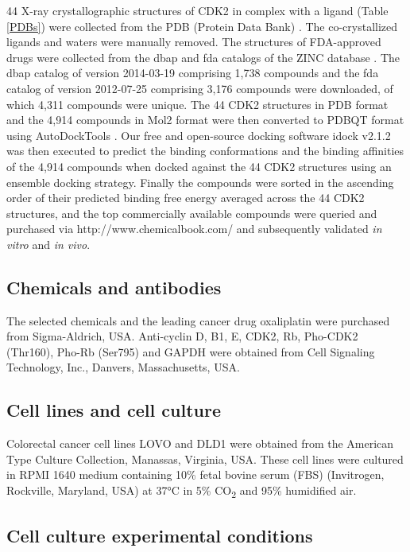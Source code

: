 \documentclass[10pt]{article}
\begin{document}
44 X-ray crystallographic structures of CDK2 in complex with a ligand (Table \ref{PDBs}) were collected from the PDB (Protein Data Bank) \citep{540,537}. The co-crystallized ligands and waters were manually removed. The structures of FDA-approved drugs were collected from the dbap and fda catalogs of the ZINC database \citep{532,1178}. The dbap catalog of version 2014-03-19 comprising 1,738 compounds and the fda catalog of version 2012-07-25 comprising 3,176 compounds were downloaded, of which 4,311 compounds were unique. The 44 CDK2 structures in PDB format and the 4,914 compounds in Mol2 format were then converted to PDBQT format using AutoDockTools \citep{596}. Our free and open-source docking software idock v2.1.2 \citep{1153,1362} was then executed to predict the binding conformations and the binding affinities of the 4,914 compounds when docked against the 44 CDK2 structures using an ensemble docking strategy. Finally the compounds were sorted in the ascending order of their predicted binding free energy averaged across the 44 CDK2 structures, and the top commercially available compounds were queried and purchased via http://www.chemicalbook.com/ and subsequently validated \textit{in vitro} and \textit{in vivo}.

\subsection*{Chemicals and antibodies}

The selected chemicals and the leading cancer drug oxaliplatin were purchased from Sigma-Aldrich, USA. Anti-cyclin D, B1, E, CDK2, Rb, Pho-CDK2 (Thr160), Pho-Rb (Ser795) and GAPDH were obtained from Cell Signaling Technology, Inc., Danvers, Massachusetts, USA.

\subsection*{Cell lines and cell culture}

Colorectal cancer cell lines LOVO and DLD1 were obtained from the American Type Culture Collection, Manassas, Virginia, USA. These cell lines were cultured in RPMI 1640 medium containing 10\% fetal bovine serum (FBS) (Invitrogen, Rockville, Maryland, USA) at 37°C in 5\% CO\textsubscript{2} and 95\% humidified air.

\subsection*{Cell culture experimental conditions}
\end{document}
